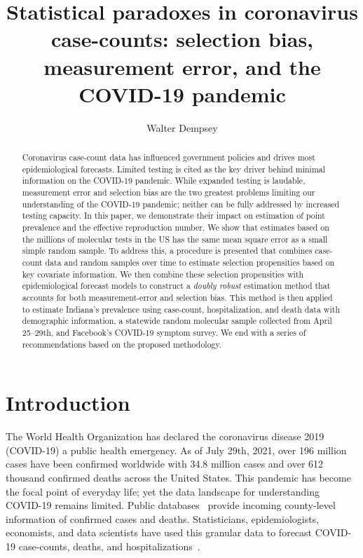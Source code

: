 \documentclass[11pt]{amsart}
\numberwithin{equation}{section}
\theoremstyle{plain}
\begin{document}
\title[Statistical paradoxes in coronavirus case-counts]{Statistical paradoxes in coronavirus case-counts: selection bias, measurement error, and the COVID-19 pandemic} %

\author{Walter Dempsey}
\address{Department of Biostatistics, University of Michigan, Ann Arbor, MI 48109}

\begin{abstract}
  Coronavirus case-count data has influenced government policies and drives most epidemiological forecasts. Limited testing is cited as the key driver behind minimal information on the COVID-19 pandemic. While expanded testing is laudable, measurement error and selection bias are the two greatest problems limiting our understanding of the COVID-19 pandemic; neither can be fully addressed by increased testing capacity. In this paper, we demonstrate their impact on estimation of point prevalence and the effective reproduction number. We show that estimates based on the millions of molecular tests in the US has the same mean square error as a small simple random sample.  To address this, a procedure is presented that combines case-count data and random samples over time to estimate selection propensities based on key covariate information. We then combine these selection propensities with epidemiological forecast models to construct a \emph{doubly robust} estimation method that accounts for both measurement-error and selection bias.  This method is then applied to estimate Indiana's prevalence using case-count, hospitalization, and death data with demographic information, a statewide random molecular sample collected from April 25--29th, and Facebook's COVID-19 symptom survey.  We end with a series of recommendations based on the proposed methodology.
\end{abstract}

\maketitle

\newpage


\section{Introduction}
The World Health Organization has declared the coronavirus disease 2019 (COVID-19) a public health emergency.  As of July 29th, 2021, over 196 million cases have been confirmed worldwide with 34.8 million cases and over 612 thousand confirmed deaths across the United States. This pandemic
has become the focal point of everyday life; yet the data landscape for understanding COVID-19 remains limited.  Public databases~\citep{JHU_Lancet,NYT} provide incoming county-level information of confirmed cases and deaths.  Statisticians, epidemiologists, economists, and data scientists have used this granular data to forecast COVID-19 case-counts, deaths, and hospitalizations~\citep{Giordano2020,Song2020,Ray2020,2020.IHME,Wang2020.03,JTD36385}.
\end{document}
